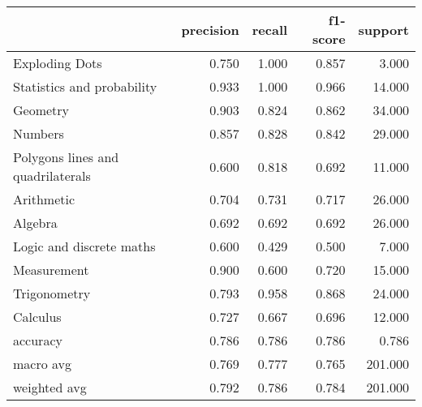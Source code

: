 \begin{tabular}{lrrrr}
\toprule
{} &  precision &  recall &  f1-score &  support \\
\midrule
Exploding Dots                    &      0.750 &   1.000 &     0.857 &    3.000 \\
Statistics and probability        &      0.933 &   1.000 &     0.966 &   14.000 \\
Geometry                          &      0.903 &   0.824 &     0.862 &   34.000 \\
Numbers                           &      0.857 &   0.828 &     0.842 &   29.000 \\
Polygons lines and quadrilaterals &      0.600 &   0.818 &     0.692 &   11.000 \\
Arithmetic                        &      0.704 &   0.731 &     0.717 &   26.000 \\
Algebra                           &      0.692 &   0.692 &     0.692 &   26.000 \\
Logic and discrete maths          &      0.600 &   0.429 &     0.500 &    7.000 \\
Measurement                       &      0.900 &   0.600 &     0.720 &   15.000 \\
Trigonometry                      &      0.793 &   0.958 &     0.868 &   24.000 \\
Calculus                          &      0.727 &   0.667 &     0.696 &   12.000 \\
accuracy                          &      0.786 &   0.786 &     0.786 &    0.786 \\
macro avg                         &      0.769 &   0.777 &     0.765 &  201.000 \\
weighted avg                      &      0.792 &   0.786 &     0.784 &  201.000 \\
\bottomrule
\end{tabular}
